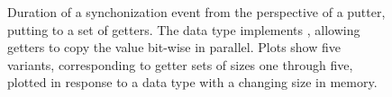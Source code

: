 \begin{figure}
	\centering
	\caption[Synchronization duration for SISO with copy-type data.]{Duration of a synchonization event from the perspective of a putter, putting to a set of getters. The data type implements , allowing getters to copy the value bit-wise in parallel. Plots show five variants, corresponding to getter sets of sizes one through five, plotted in response to a data type with a changing size in memory.}
	\label{fig:simo_copy}
\end{figure}



